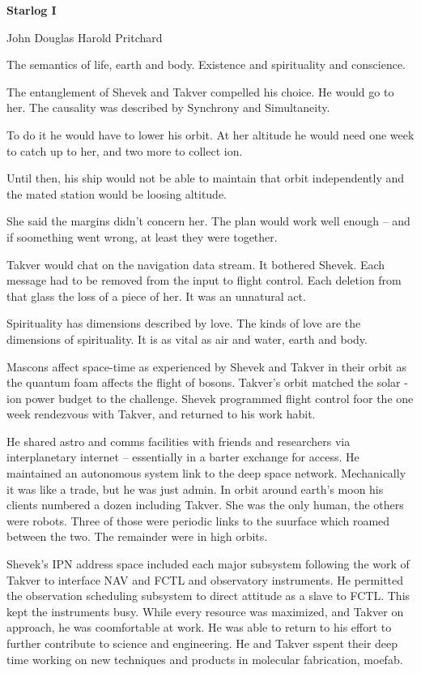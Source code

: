 

\centerline{\bf Starlog I}

\smallskip

\centerline{John Douglas Harold Pritchard}

\break



The semantics of life, earth and body.  Existence and spirituality and
conscience.  

The entanglement of Shevek and Takver compelled his choice.  He would
go to her.  The causality was described by Synchrony and Simultaneity.

To do it he would have to lower his orbit.  At her altitude he would
need one week to catch up to her, and two more to collect ion.

Until then, his ship would not be able to maintain that orbit
independently and the mated station would be loosing altitude.

She said the margins didn't concern her.  The plan would work well
enough -- and if soomething went wrong, at least they were together.


Takver would chat on the navigation data stream.  It bothered Shevek.
Each message had to be removed from the input to flight control.  Each
deletion from that glass the loss of a piece of her.  It was an
unnatural act.

Spirituality has dimensions described by love.  The kinds of love are
the dimensions of spirituality.  It is as vital as air and water,
earth and body.

Mascons affect space-time as experienced by Shevek and Takver in their
orbit as the quantum foam affects the flight of bosons.  Takver's
orbit matched the solar - ion power budget to the challenge.  Shevek
programmed flight control foor the one week rendezvous with Takver,
and returned to his work habit.

He shared astro and comms facilities with friends and researchers via
interplanetary internet -- essentially in a barter exchange for
access.  He maintained an autonomous system link to the deep space
network.  Mechanically it was like a trade, but he was just admin.  In
orbit around earth's moon his clients numbered a dozen including
Takver.  She was the only human, the others were robots.  Three of
those were periodic links to the suurface which roamed between the
two.  The remainder were in high orbits.

Shevek's IPN address space included each major subsystem following the
work of Takver to interface NAV and FCTL and observatory instruments.
He permitted the observation scheduling subsystem to direct attitude
as a slave to FCTL.  This kept the instruments busy.  While every
resource was maximized, and Takver on approach, he was coomfortable at
work.  He was able to return to his effort to further contribute to
science and engineering.  He and Takver sspent their deep time working
on new techniques and products in molecular fabrication, moefab.

